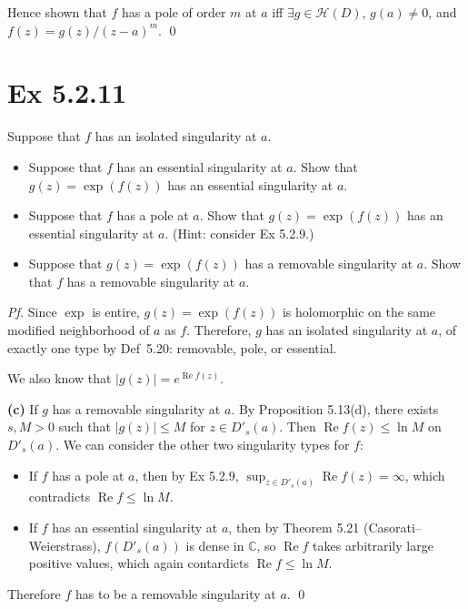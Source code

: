 \documentclass[a4paper]{article}
\newcommand{\C}{\mathbb{C}}
\newcommand{\Hol}{\mathcal{H}}
\renewcommand{\Re}{\operatorname{Re}}
\begin{document}
\medskip
Hence shown that $f$ has a pole of order $m$ at $a$ iff $\exists g \in \Hol(D)$, $g(a) \neq 0$, and $f(z) = g(z)/(z-a)^m$. \qed

\newpage
\section*{Ex 5.2.11}

\begin{tcolorbox}[colback=gray!10, colframe=black, boxrule=0.5pt, arc=2mm]
Suppose that $f$ has an isolated singularity at $a$.
\begin{itemize}
\item[(a)] Suppose that $f$ has an essential singularity at $a$. Show that
  $g(z) = \exp(f(z))$ has an essential singularity at $a$.
\item[(b)] Suppose that $f$ has a pole at $a$. Show that $g(z) = \exp(f(z))$ has an
  essential singularity at $a$. (Hint: consider Ex 5.2.9.)
\item[(c)] Suppose that $g(z) = \exp(f(z))$ has a removable singularity at $a$. Show
  that $f$ has a removable singularity at $a$.
\end{itemize}
\end{tcolorbox}

\textit{Pf.} Since $\exp$ is entire, $g(z) = \exp(f(z))$ is holomorphic on the same modified
neighborhood of $a$ as $f$. Therefore, $g$ has an isolated singularity at $a$, of
exactly one type by Def~5.20: removable, pole, or essential. 

We also know that $|g(z)| = e^{\Re f(z)}$.

\medskip
\textbf{(c)} If $g$ has a removable singularity at $a$. By Proposition 5.13(d),
there exists $s, M > 0$ such that $|g(z)| \leq M$ for $z \in D'_s(a)$. Then
$\Re f(z) \leq \ln M$ on $D'_s(a)$. We can consider the other two singularity types for $f$:
\begin{itemize}
\item If $f$ has a pole at $a$, then by Ex 5.2.9, $\sup_{z \in D'_s(a)} \Re f(z) = \infty$,
which contradicts $\Re f \leq \ln M$.
\item If $f$ has an essential singularity at $a$, then by
Theorem 5.21 (Casorati--Weierstrass), $f(D'_s(a))$ is dense in $\C$, so $\Re f$ takes
arbitrarily large positive values, which again contardicts $\Re f \leq \ln M$.
\end{itemize}
Therefore $f$ has to be a removable singularity at $a$. \qed
\end{document}
